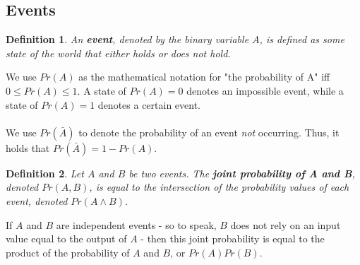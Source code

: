 \documentclass{article}
\newtheorem{mydef}{Definition}
\begin{document}
\subsection{Events}
\begin{mydef}
An \textbf{event}, denoted by the binary variable $A$, is defined as some state of the world that either holds or does not hold.
\end{mydef}
We use $Pr(A)$ as the mathematical notation for "the probability of A" iff $0\leq Pr(A)\leq 1$. A state of $Pr(A) = 0$ denotes an impossible event, while a state of $Pr(A) = 1$ denotes a certain event.\\
\\
We use $Pr(\bar{A})$ to denote the probability of an event \textit{not} occurring. Thus, it holds that $Pr(\bar{A}) = 1 - Pr(A)$.\\
\begin{mydef}
Let $A$ and $B$ be two events. The \textbf{joint probability of A and B}, denoted $Pr(A,B)$, is equal to the intersection of the probability values of each event, denoted $Pr(A \land B)$.
\end{mydef}
If $A$ and $B$ are independent events - so to speak, $B$ does not rely on an input value equal to the output of $A$ - then this joint probability is equal to the product of the probability of $A$ and $B$, or $Pr(A)Pr(B)$.
\end{document}
